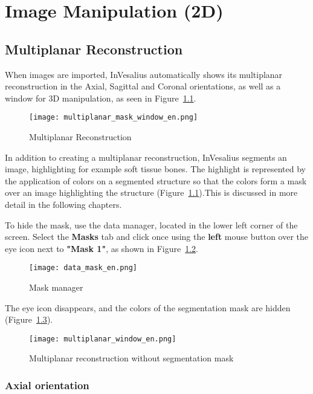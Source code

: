\chapter{Image Manipulation (2D)}

\section{Multiplanar Reconstruction}

When images are imported, InVesalius automatically shows its multiplanar reconstruction in the Axial, Sagittal and Coronal orientations, as well as a window for 3D manipulation, as seen in Figure~\ref{fig:mpr}.

\begin{figure}[!htb]
\centering
\texttt{[image: multiplanar\_mask\_window\_en.png]}
\caption{Multiplanar Reconstruction}
\label{fig:mpr}
\end{figure}

\newpage

In addition to creating a multiplanar reconstruction, InVesalius segments an image, highlighting for example soft tissue bones. The highlight is represented by the application of colors on a segmented structure so that the colors form a mask over an image highlighting the structure (Figure~\ref{fig:mpr}).This is discussed in more detail in the following chapters.

To hide the mask, use the data manager, located in the lower left corner of the screen. Select the \textbf{Masks} tab and click once using the \textbf{left} mouse button over the eye icon next to \textbf{"Mask 1"}, as shown in Figure~\ref{fig:ger_masc}.

\begin{figure}[!htb]
\centering
\texttt{[image: data\_mask\_en.png]}
\caption{Mask manager}
\label{fig:ger_masc}
\end{figure}

The eye icon disappears, and the colors of the segmentation mask are hidden (Figure~\ref{fig:mpr_sem_mask}).

\begin{figure}[!htb]
\centering
\texttt{[image: multiplanar\_window\_en.png]}
\caption{Multiplanar reconstruction without segmentation mask}
\label{fig:mpr_sem_mask}
\end{figure}

\subsection{Axial orientation}

